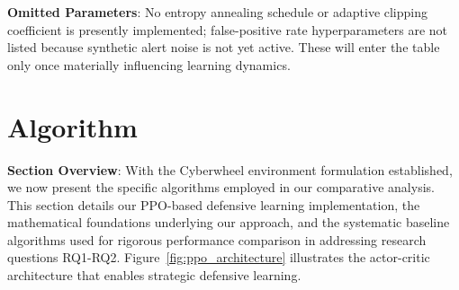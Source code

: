 \documentclass[12pt,oneside]{article}
\begin{document}
	\textbf{Omitted Parameters}: No entropy annealing schedule or adaptive clipping coefficient is presently implemented; false-positive rate hyperparameters are not listed because synthetic alert noise is not yet active. These will enter the table only once materially influencing learning dynamics.


\clearpage

\section{Algorithm}

\textbf{Section Overview}: With the Cyberwheel environment formulation established, we now present the specific algorithms employed in our comparative analysis. This section details our PPO-based defensive learning implementation, the mathematical foundations underlying our approach, and the systematic baseline algorithms used for rigorous performance comparison in addressing research questions RQ1-RQ2. Figure~\ref{fig:ppo_architecture} illustrates the actor-critic architecture that enables strategic defensive learning.
\end{document}
